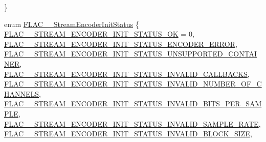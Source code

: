 \begin{DoxyCompactItemize}
 \}
\item 
enum \mbox{\hyperlink{group__flac__stream__encoder_ga3bb869620af2b188d77982a5c30b047d}{F\+L\+A\+C\+\_\+\+\_\+\+Stream\+Encoder\+Init\+Status}} \{ \newline
\mbox{\hyperlink{group__flac__stream__encoder_gga3bb869620af2b188d77982a5c30b047da20501dce552da74c5df935eeaa0c9ee3}{F\+L\+A\+C\+\_\+\+\_\+\+S\+T\+R\+E\+A\+M\+\_\+\+E\+N\+C\+O\+D\+E\+R\+\_\+\+I\+N\+I\+T\+\_\+\+S\+T\+A\+T\+U\+S\+\_\+\+OK}} = 0, 
\mbox{\hyperlink{group__flac__stream__encoder_gga3bb869620af2b188d77982a5c30b047da9c64e5f9020d8799e1cd9d39d50e6955}{F\+L\+A\+C\+\_\+\+\_\+\+S\+T\+R\+E\+A\+M\+\_\+\+E\+N\+C\+O\+D\+E\+R\+\_\+\+I\+N\+I\+T\+\_\+\+S\+T\+A\+T\+U\+S\+\_\+\+E\+N\+C\+O\+D\+E\+R\+\_\+\+E\+R\+R\+OR}}, 
\mbox{\hyperlink{group__flac__stream__encoder_gga3bb869620af2b188d77982a5c30b047da8a822b011de88b67c114505ffef39327}{F\+L\+A\+C\+\_\+\+\_\+\+S\+T\+R\+E\+A\+M\+\_\+\+E\+N\+C\+O\+D\+E\+R\+\_\+\+I\+N\+I\+T\+\_\+\+S\+T\+A\+T\+U\+S\+\_\+\+U\+N\+S\+U\+P\+P\+O\+R\+T\+E\+D\+\_\+\+C\+O\+N\+T\+A\+I\+N\+ER}}, 
\mbox{\hyperlink{group__flac__stream__encoder_gga3bb869620af2b188d77982a5c30b047dac2cf461f02e20513003b8cadeae03f9f}{F\+L\+A\+C\+\_\+\+\_\+\+S\+T\+R\+E\+A\+M\+\_\+\+E\+N\+C\+O\+D\+E\+R\+\_\+\+I\+N\+I\+T\+\_\+\+S\+T\+A\+T\+U\+S\+\_\+\+I\+N\+V\+A\+L\+I\+D\+\_\+\+C\+A\+L\+L\+B\+A\+C\+KS}}, 
\newline
\mbox{\hyperlink{group__flac__stream__encoder_gga3bb869620af2b188d77982a5c30b047da0541c4f827f081b9f1c54c9441e4aa65}{F\+L\+A\+C\+\_\+\+\_\+\+S\+T\+R\+E\+A\+M\+\_\+\+E\+N\+C\+O\+D\+E\+R\+\_\+\+I\+N\+I\+T\+\_\+\+S\+T\+A\+T\+U\+S\+\_\+\+I\+N\+V\+A\+L\+I\+D\+\_\+\+N\+U\+M\+B\+E\+R\+\_\+\+O\+F\+\_\+\+C\+H\+A\+N\+N\+E\+LS}}, 
\mbox{\hyperlink{group__flac__stream__encoder_gga3bb869620af2b188d77982a5c30b047dad6d2631f464183c0c165155200882e6b}{F\+L\+A\+C\+\_\+\+\_\+\+S\+T\+R\+E\+A\+M\+\_\+\+E\+N\+C\+O\+D\+E\+R\+\_\+\+I\+N\+I\+T\+\_\+\+S\+T\+A\+T\+U\+S\+\_\+\+I\+N\+V\+A\+L\+I\+D\+\_\+\+B\+I\+T\+S\+\_\+\+P\+E\+R\+\_\+\+S\+A\+M\+P\+LE}}, 
\mbox{\hyperlink{group__flac__stream__encoder_gga3bb869620af2b188d77982a5c30b047da6fdcde9e18c37450c79e8f12b9d9c134}{F\+L\+A\+C\+\_\+\+\_\+\+S\+T\+R\+E\+A\+M\+\_\+\+E\+N\+C\+O\+D\+E\+R\+\_\+\+I\+N\+I\+T\+\_\+\+S\+T\+A\+T\+U\+S\+\_\+\+I\+N\+V\+A\+L\+I\+D\+\_\+\+S\+A\+M\+P\+L\+E\+\_\+\+R\+A\+TE}}, 
\mbox{\hyperlink{group__flac__stream__encoder_gga3bb869620af2b188d77982a5c30b047da652c445f1bd8b6cfb963a30bf416c95a}{F\+L\+A\+C\+\_\+\+\_\+\+S\+T\+R\+E\+A\+M\+\_\+\+E\+N\+C\+O\+D\+E\+R\+\_\+\+I\+N\+I\+T\+\_\+\+S\+T\+A\+T\+U\+S\+\_\+\+I\+N\+V\+A\+L\+I\+D\+\_\+\+B\+L\+O\+C\+K\+\_\+\+S\+I\+ZE}}, 

\end{DoxyCompactItemize}

